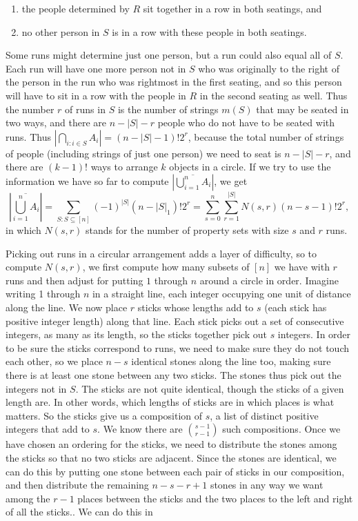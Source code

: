\documentclass[10pt,]{book}
\theoremstyle{plain}
\theoremstyle{definition}
\theoremstyle{definition}
\numberwithin{equation}{chapter}
\begin{document}
\begin{exerciselist}
\begin{enumerate}[label=(\alph*)]
\item\hypertarget{li-88}{}the people determined by \(R\) sit together in a row in both seatings, and%
\item\hypertarget{li-89}{}no other person in \(S\) is in a row with these people in both seatings.%
\end{enumerate}
 Some runs might determine just one person, but a run could also equal all of \(S\). Each run will have one more person not in \(S\) who was originally to the right of the person in the run who was rightmost in the first seating, and so this person will have to sit in a row with the people in \(R\) in the second seating as well. Thus the number \(r\) of runs in \(S\) is the number of strings \(m(S)\) that may be seated in two ways, and there are \(n-|S|-r\) people who do not have to be seated with runs. Thus \(\left|\bigcap_{i\colon i\in S}A_i\right| = (n-|S|-1)!2^r\), because the total number of strings of people (including strings of just one person) we need to seat is \(n-|S| -r\), and there are \((k-1)!\) ways to arrange \(k\) objects in a circle. If we try to use the information we have so far to compute \(\left|\overline{\bigcup_{i=1}^n A_i}\right|\), we get%
\begin{equation*}
\left|\overline{\bigcup_{i=1}^n A_i}\right| =\sum_{S:S\subseteq [n]}(-1)^{|S|}(n-|S|_1)!2^r
=\sum_{s=0}^n\sum_{r=1}^{|S|}N(s,r)(n-s-1)!2^r,
\end{equation*}
in which \(N(s,r)\) stands for the number of property sets with size \(s\) and \(r\) runs.%
\par
Picking out runs in a circular arrangement adds a layer of difficulty, so to compute \(N(s,r)\), we first compute how many subsets of \([n]\) we have with \(r\) runs and then adjust for putting \(1\) through \(n\) around a circle in order.  Imagine writing 1 through \(n\) in a straight line, each integer occupying one unit of distance along the line. We now place \(r\) sticks whose lengths add to \(s\) (each stick has positive integer length) along that line. Each stick picks out a set of consecutive integers, as many as its length, so the sticks together pick out \(s\) integers. In order to be sure the sticks correspond to runs, we need to make sure they do not touch each other, so we place \(n-s\) identical stones along the line too, making sure there is at least one stone between any two sticks. The stones thus pick out the integers not in \(S\). The sticks are not quite identical, though the sticks of a given length are. In other words, which lengths of sticks are in which places is what matters. So the sticks give us a composition of \(s\), a list of distinct positive integers that add to \(s\). We know there are \(\binom{s-1}{r-1}\) such compositions. Once we have chosen an ordering for the sticks, we need to distribute the stones among the sticks so that no two sticks are adjacent.  Since the stones are identical, we can do this by putting one stone between each pair of sticks in our composition, and then distribute the remaining \(n-s-r+1\) stones in any way we want among the \(r-1\) places between the sticks and the two places to the left and right of all the sticks.. We can do this in%

\end{exerciselist}
\end{document}
